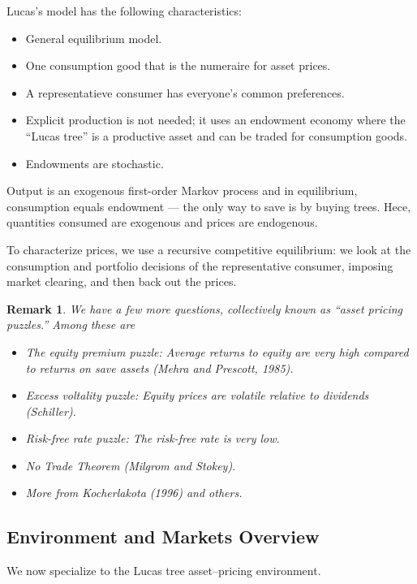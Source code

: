 \documentclass{tufte-handout}
\newtheorem{rmk}[thm]{Remark}
\theoremstyle{definition}
\begin{document}
Lucas's model has the following characteristics:
\begin{itemize}
	\item General equilibrium model.
	\item One consumption good that is the numeraire for asset prices.
	\item A representatieve consumer has everyone's common preferences.
	\item Explicit production is not needed; it uses an endowment economy where the ``Lucas tree'' is a productive asset and can be traded for consumption goods.
	\item Endowments are stochastic.
\end{itemize}

Output is an exogenous first-order Markov process and in equilibrium, consumption equals endowment --- the only way to save is by buying trees. Hece, quantities consumed are exogenous and prices are endogenous.

To characterize prices, we use a recursive competitive equilibrium: we look at the consumption and portfolio decisions of the representative consumer, imposing market clearing, and then back out the prices.

\begin{rmk}
	We have a few more questions, collectively known as ``asset pricing puzzles.'' Among these are
	\begin{itemize}
		\item The equity premium puzzle: Average returns to equity are very high compared to returns on save assets (Mehra and Prescott, 1985).
		\item Excess voltality puzzle: Equity prices are volatile relative to dividends (Schiller).
		\item Risk-free rate puzzle: The risk-free rate is very low.
		\item No Trade Theorem (Milgrom and Stokey).
		\item More from Kocherlakota (1996) and others.
	\end{itemize}
\end{rmk}

\subsection{Environment and Markets Overview}

We now specialize to the Lucas tree asset–pricing environment.
\end{document}
